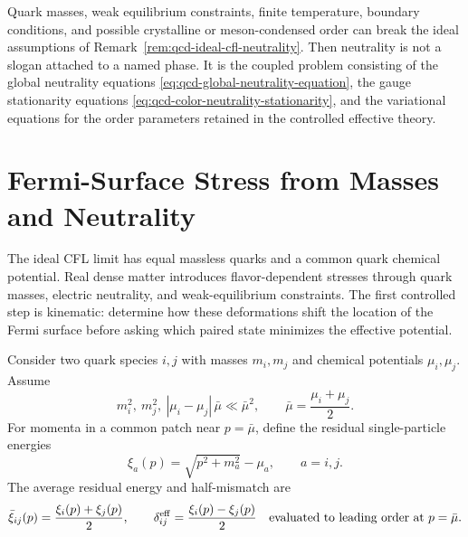\begin{remark}
\label{rem:qcd-neutrality-beyond-ideal-cfl}
Quark masses, weak equilibrium constraints, finite temperature, boundary
conditions, and possible crystalline or meson-condensed order can break the
ideal assumptions of Remark~\ref{rem:qcd-ideal-cfl-neutrality}.  Then
neutrality is not a slogan attached to a named phase.  It is the coupled
problem consisting of the global neutrality equations
\eqref{eq:qcd-global-neutrality-equation}, the gauge stationarity equations
\eqref{eq:qcd-color-neutrality-stationarity}, and the variational equations
for the order parameters retained in the controlled effective theory.
\end{remark}

\section{Fermi-Surface Stress from Masses and Neutrality}
\label{sec:qcd-fermi-surface-stress}

The ideal CFL limit has equal massless quarks and a common quark chemical
potential.  Real dense matter introduces flavor-dependent stresses through
quark masses, electric neutrality, and weak-equilibrium constraints.  The
first controlled step is kinematic: determine how these deformations shift
the location of the Fermi surface before asking which paired state minimizes
the effective potential.

\begin{definition}
\label{def:qcd-effective-fermi-surface-mismatch}
Consider two quark species \(i,j\) with masses \(m_i,m_j\) and chemical
potentials \(\mu_i,\mu_j\).  Assume
\[
  m_i^2,\ m_j^2,\ |\mu_i-\mu_j|\,\bar\mu
  \ll
  \bar\mu^2,
  \qquad
  \bar\mu=\frac{\mu_i+\mu_j}{2}.
\]
For momenta in a common patch near \(p=\bar\mu\), define the residual
single-particle energies
\begin{equation}
  \xi_a(p)=\sqrt{p^2+m_a^2}-\mu_a,
  \qquad a=i,j.
  \label{eq:qcd-mass-stressed-xi}
\end{equation}
The average residual energy and half-mismatch are
\begin{equation}
  \bar\xi_{ij}(p)
  =
  \frac{\xi_i(p)+\xi_j(p)}{2},
  \qquad
  \delta_{ij}^{\rm eff}
  =
  \frac{\xi_i(p)-\xi_j(p)}{2}
  \quad\text{evaluated to leading order at }p=\bar\mu .
  \label{eq:qcd-effective-mismatch-definition}
\end{equation}
\end{definition}

